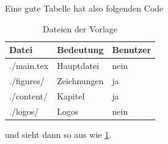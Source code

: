 Eine gute Tabelle hat also folgenden Code
\begin{latex}[caption={Tabellen in LaTeX},label={lst:tables}]
\begin{table}
  \centering
  \begin{tabular}{l l l}                       \toprule
    Datei       &  Bedeutung    &  Benutzer \\ \midrule
    ./main.tex  &  Hauptdatei   &  nein     \\
    ./figures/  &  Zeichnungen  &  ja       \\
    ./content/  &  Kapitel      &  ja       \\
    ./logos/    &  Logos        &  nein     \\ \bottomrule
  \end{tabular}
  \caption{Dateien der Vorlage}
  \label{tab:files-dirs-of-template}
\end{table}
\end{latex}
und sieht dann so aus wie \cref{tab:files-dirs-of-template}.

